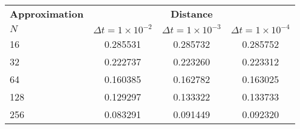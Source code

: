 \begin{frame}
	\begin{table}
		\centering
		\begin{tabular}{lccc}
			\toprule
			\multicolumn{1}{c}{\textbf{Approximation}} & \multicolumn{3}{c}{\textbf{Distance}} \\
			\hspace{12mm} $N$ & $\Delta t=1\times 10^{-2}$ & $\Delta t=1\times 10^{-3}$ & $\Delta t=1\times 10^{-4}$ \\
			\midrule
			\hspace{12mm} 16 & 0.285531 & 0.285732 & 0.285752 \\
			\midrule
			\hspace{12mm} 32 & 0.222737 & 0.223260 & 0.223312 \\
			\midrule
			\hspace{12mm} 64 & 0.160385 & 0.162782 & 0.163025 \\
			\midrule
			\hspace{12mm} 128 & 0.129297 & 0.133322 & 0.133733 \\
			\midrule
			\hspace{12mm} 256 & 0.083291 & 0.091449 & 0.092320 \\
			\bottomrule
		\end{tabular}
	\end{table}
\end{frame}